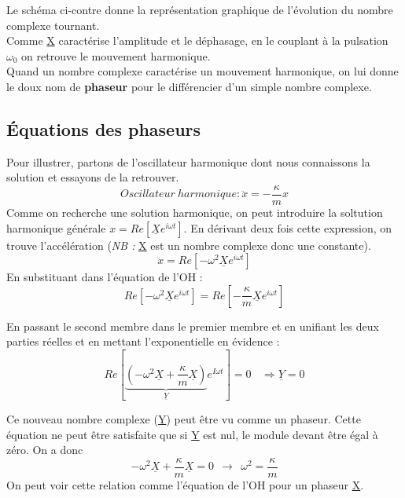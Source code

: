 \documentclass[british,french,11pt, a4paper, openany]{book}
\begin{document}
	Le schéma ci-contre donne la représentation graphique de l'évolution du nombre complexe tournant.\\
	
	Comme \underline{X} caractérise l'amplitude et le déphasage, en le couplant à la pulsation $\omega_0$ on retrouve le mouvement harmonique.\\
	
	Quand un nombre complexe caractérise un mouvement harmonique, on lui donne le doux nom de \textbf{phaseur} pour le différencier d'un simple nombre complexe.
	
	\subsection{Équations des phaseurs}
	Pour illustrer, partons de l'oscillateur harmonique dont nous connaissons la solution et essayons de la retrouver.
	\begin{equation}
		Oscillateur\ harmonique : \ddot{x} = -\frac{\kappa}{m}x
	\end{equation}
	Comme on recherche une solution harmonique, on peut introduire la soltution harmonique générale $x = Re\left[\underline{X}e^{i\omega t}\right]$. En dérivant deux fois cette expression, on trouve l'accélération (\textit{NB :} \underline{X} est un nombre complexe donc une constante).
	\begin{equation}
		\ddot{x} = Re\left[-\omega^2 \underline{X}e^{i\omega t}\right]
	\end{equation}
	En substituant dans l'équation de l'OH :
	\begin{equation}
		Re\left[-\omega^2 \underline{X}e^{i\omega t}\right] = Re\left[-\frac{\kappa}{m}\underline{X}e^{i\omega t}\right]
	\end{equation}
	
	En passant le second membre dans le premier membre et en unifiant les deux parties réelles et en mettant l'exponentielle en évidence :
	\begin{equation}
		Re\left[\underbrace{(-\omega^2\underline{X} + \frac{\kappa}{m}\underline{X})}_{\underline{Y}}e^{I\omega t}\right] = 0\ \ \ \ \Rightarrow \underline{Y} = 0
	\end{equation}
	
	Ce nouveau nombre complexe (\underline{Y}) peut être vu comme un phaseur. Cette équation ne peut être satisfaite que si \underline{Y} est nul, le module devant être égal à zéro. On a donc 
	\begin{equation}
		-\omega^2 \underline{X} + \frac{\kappa}{m}\underline{X} = 0\ \ \rightarrow\ \  \omega^2 = \frac{\kappa}{m}
	\end{equation}
	On peut voir cette relation comme l'équation de l'OH pour un phaseur \underline{X}.
	
\end{document}

